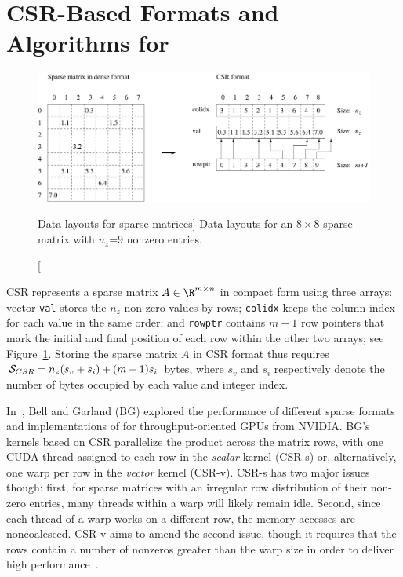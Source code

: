 \section{CSR-Based Formats and Algorithms for \spmv}
\label{2017-csr-spmv:sec:spmv}

\begin{figure}[t]
\begin{center}
\includegraphics[width=\textwidth]{plots/csr_format}
\end{center}
\caption
[Data layouts for sparse matrices]
{Data layouts
for an $8 \times 8$ sparse matrix with $n_z$=9 nonzero entries.}
\label{2017-csr-spmv:fig:spmv}
\end{figure}


CSR represents a sparse matrix $A \in \R^{m \times n}$ in compact form
using three arrays:
vector {\tt val} stores the $n_z$ non-zero values by rows;
{\tt colidx} keeps the column index for each value in the same order;
and {\tt rowptr} contains $m+1$ row pointers that mark the initial
and final position of each row within the other two arrays;
see Figure~\ref{2017-csr-spmv:fig:spmv}.
Storing the sparse matrix $A$ in CSR format thus requires ${\cal S}_{CSR} = n_z(s_v+s_i)+(m+1)s_i$ bytes, where
$s_v$ and $s_i$ respectively denote the number of bytes occupied 
by each value and integer index.

In~\cite{Bell:SpMV:NVIDIA:2008}, Bell and Garland (BG) explored the performance
of different sparse formats and implementations of \spmv for throughput-oriented GPUs from NVIDIA.
BG's \spmv kernels based on CSR
parallelize the product
across the matrix rows,
with one CUDA thread assigned to each row in the {\em scalar} kernel (CSR-s) or,
alternatively, one warp per row in the {\em vector} kernel (CSR-v).
CSR-s has two major issues though: first, for sparse matrices with an
irregular row distribution of their non-zero entries,
many threads within a warp will likely remain idle.
Second, since each thread of a warp works on a different row,
the memory accesses are noncoalesced.
CSR-v aims to amend the second issue,
though it
requires that the rows contain a number of nonzeros greater than the warp
size in order to deliver high performance~\cite{Bell:SpMV:NVIDIA:2008}.

